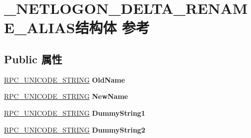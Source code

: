 \hypertarget{struct___n_e_t_l_o_g_o_n___d_e_l_t_a___r_e_n_a_m_e___a_l_i_a_s}{}\section{\+\_\+\+N\+E\+T\+L\+O\+G\+O\+N\+\_\+\+D\+E\+L\+T\+A\+\_\+\+R\+E\+N\+A\+M\+E\+\_\+\+A\+L\+I\+A\+S结构体 参考}
\label{struct___n_e_t_l_o_g_o_n___d_e_l_t_a___r_e_n_a_m_e___a_l_i_a_s}
\subsection*{Public 属性}
\begin{DoxyCompactItemize}
\item 
\mbox{\label{struct___n_e_t_l_o_g_o_n___d_e_l_t_a___r_e_n_a_m_e___a_l_i_a_s_ae7c1f3a104e2ae393a83b6f548d78c82}} 
\hyperlink{struct___r_p_c___u_n_i_c_o_d_e___s_t_r_i_n_g}{R\+P\+C\+\_\+\+U\+N\+I\+C\+O\+D\+E\+\_\+\+S\+T\+R\+I\+NG} {\bfseries Old\+Name}
\item 
\mbox{\label{struct___n_e_t_l_o_g_o_n___d_e_l_t_a___r_e_n_a_m_e___a_l_i_a_s_a26e394cfe2baed6c59bdb2ef99a5af0f}} 
\hyperlink{struct___r_p_c___u_n_i_c_o_d_e___s_t_r_i_n_g}{R\+P\+C\+\_\+\+U\+N\+I\+C\+O\+D\+E\+\_\+\+S\+T\+R\+I\+NG} {\bfseries New\+Name}
\item 
\mbox{\label{struct___n_e_t_l_o_g_o_n___d_e_l_t_a___r_e_n_a_m_e___a_l_i_a_s_a70a1217639a9891c88a7420097415814}} 
\hyperlink{struct___r_p_c___u_n_i_c_o_d_e___s_t_r_i_n_g}{R\+P\+C\+\_\+\+U\+N\+I\+C\+O\+D\+E\+\_\+\+S\+T\+R\+I\+NG} {\bfseries Dummy\+String1}
\item 
\mbox{\label{struct___n_e_t_l_o_g_o_n___d_e_l_t_a___r_e_n_a_m_e___a_l_i_a_s_aab771c8b8f8453c6c5f9f336f4b9f578}} 
\hyperlink{struct___r_p_c___u_n_i_c_o_d_e___s_t_r_i_n_g}{R\+P\+C\+\_\+\+U\+N\+I\+C\+O\+D\+E\+\_\+\+S\+T\+R\+I\+NG} {\bfseries Dummy\+String2}
\item 
\mbox{\label{struct___n_e_t_l_o_g_o_n___d_e_l_t_a___r_e_n_a_m_e___a_l_i_a_s_a3bd09466b9dee2f931afeb6d504d43d0}} 

\end{DoxyCompactItemize}
